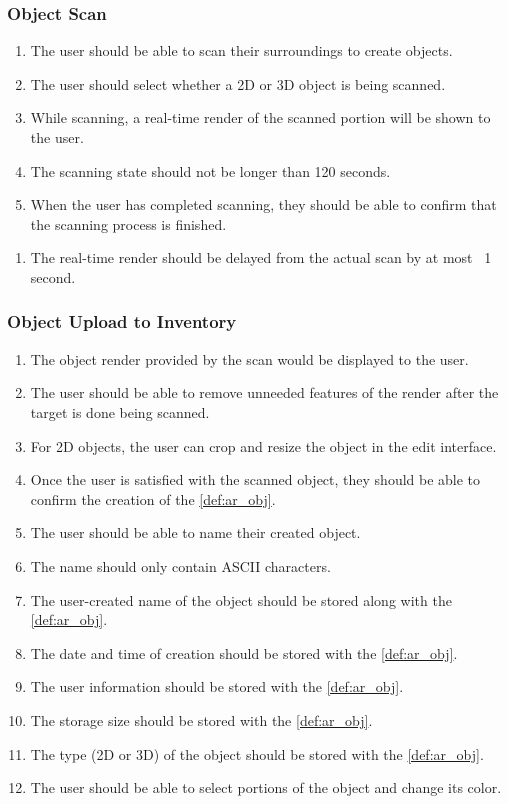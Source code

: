 \documentclass{article}
\begin{document}
\subsubsection{Object Scan}
\label{ssub:obj_scan}
\begin{enumerate}[label=OS-FR\arabic*:]
    \item The user should be able to scan their surroundings to create objects.
    \item The user should select whether a 2D or 3D object is being scanned.
    \item While scanning, a real-time render of the scanned portion will be shown to the user.
    \item The scanning state should not be longer than 120 seconds.
    \item When the user has completed scanning, they should be able to confirm that the scanning process is finished.
\end{enumerate}

\begin{enumerate}[label=OS-NFR\arabic*:]
    \item The real-time render should be delayed from the actual scan by at most ~1 second.
\end{enumerate}

\subsubsection{Object Upload to Inventory}
\label{ssub:obj_upload_inv}
\begin{enumerate}[label=OUI-FR\arabic*:]
    \item The object render provided by the scan would be displayed to the user.
    \item The user should be able to remove unneeded features of the render after the target is done being scanned.
    \item For 2D objects, the user can crop and resize the object in the edit interface.
    \item Once the user is satisfied with the scanned object, they should be able to confirm the creation of the \ref{def:ar_obj}.
    \item The user should be able to name their created object.
    \item The name should only contain ASCII characters.
    \item The user-created name of the object should be stored along with the \ref{def:ar_obj}.
    \item The date and time of creation should be stored with the \ref{def:ar_obj}.
    \item The user information should be stored with the \ref{def:ar_obj}.
    \item The storage size should be stored with the \ref{def:ar_obj}.
    \item The type (2D or 3D) of the object should be stored with the \ref{def:ar_obj}.
    \item The user should be able to select portions of the object and change its color.
\end{enumerate}
\end{document}
